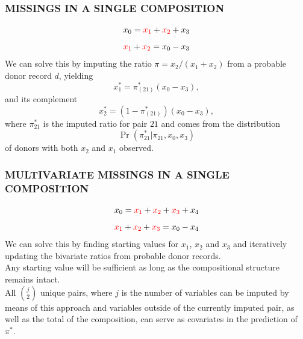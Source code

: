 \documentclass[aspectratio=169]{beamer} %
\begin{document}
\begin{frame}
  \frametitle{MISSINGS IN A SINGLE COMPOSITION}

\begin{equation*}
\label{top}
x_0=\textcolor{red}{x_1}+\textcolor{red}{x_2}+x_3
\end{equation*}
\begin{equation*}
\textcolor{red}{x_1}+\textcolor{red}{x_2}=x_0-x_3
\end{equation*}
We can solve this by imputing the ratio $\pi = x_2/(x_1+x_2)$ from a probable donor record $d$, yielding\begin{equation*}
x_1^*=\pi^*_{(21)}(x_0-x_3), 
\end{equation*}
and its complement
\begin{equation*}
x_2^*=(1-\pi^*_{(21)})(x_0-x_3),
\end{equation*}
where ${\pi^*_{21}}$ is the imputed ratio for pair $21$ and comes from the distribution
\begin{equation*}
\Pr(\pi^*_{21}|\pi_{21}, x_{0}, x_{3})
\end{equation*}
of donors with both $x_2$ and $x_1$ observed. 
\end{frame}

\begin{frame}
  \frametitle{MULTIVARIATE MISSINGS IN A SINGLE COMPOSITION}

\begin{equation*}
\label{top}
x_0=\textcolor{red}{x_1}+\textcolor{red}{x_2}+\textcolor{red}{x_3}+x_4
\end{equation*}
\begin{equation*}
\textcolor{red}{x_1}+\textcolor{red}{x_2} + \textcolor{red}{x_3}=x_0-x_4
\end{equation*}
We can solve this by finding starting values for $x_1$, $x_2$ and $x_3$ and iteratively updating the bivariate ratios from probable donor records.
\newline \\
Any starting value will be sufficient as long as the compositional structure
remains intact.
\newline \\
All ${j \choose 2}$ unique pairs, where $j$ is the number of variables can be imputed by means of this approach and variables outside of the currently imputed pair, as well as the total of the composition, can serve as covariates in the prediction of $\pi^*$.
\end{frame}
\end{document}
